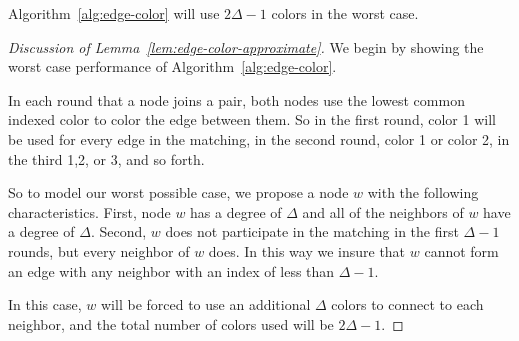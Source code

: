 \begin{lem}
\label{lem:edge-color-approximate}
Algorithm~\ref{alg:edge-color} will use $2\Delta - 1$ colors in the worst case. 
\end{lem}

\begin{proof}[Discussion of Lemma~\ref{lem:edge-color-approximate}]

We begin by showing the worst case performance of Algorithm~\ref{alg:edge-color}. 

In each round that a node joins a pair, both nodes use the lowest common indexed color to color the edge between them. So in the first round, color 1 will be used for every edge in the matching, in the second round, color 1 or color 2, in the third 1,2, or 3, and so forth. 

So to model our worst possible case, we propose a node $w$ with the following characteristics. First, node $w$ has a degree of $\Delta$ and all of the neighbors of $w$ have a degree of $\Delta$. Second, $w$ does not participate in the matching in the first $\Delta-1$ rounds, but every neighbor of $w$ does. In this way we insure that $w$ cannot form an edge with any neighbor with an index of less than $\Delta-1$. 

In this case, $w$ will be forced to use an additional $\Delta$ colors to connect to each neighbor, and the total number of colors used will be $2\Delta-1$.
\end{proof}
